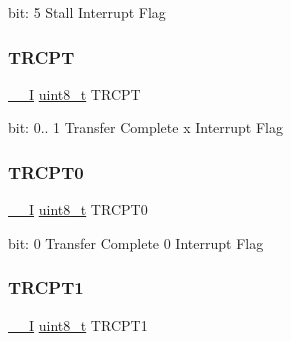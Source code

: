 bit\+: 5 Stall Interrupt Flag \mbox{\label{union_u_s_b___h_o_s_t___p_i_n_t_f_l_a_g___type_aa0eaaaed088030494d4abca08d5faf2e}} 
\subsubsection{\texorpdfstring{TRCPT}{TRCPT}}
{\footnotesize\ttfamily \mbox{\hyperlink{core__cm0plus_8h_af63697ed9952cc71e1225efe205f6cd3}{\+\_\+\+\_\+I}} \mbox{\hyperlink{union_u_s_b___h_o_s_t___p_i_n_t_f_l_a_g___type_a5b4208c6f4c4a4290c4f2804d1eb1d5b}{uint8\+\_\+t}} T\+R\+C\+PT}

bit\+: 0.. 1 Transfer Complete x Interrupt Flag \mbox{\label{union_u_s_b___h_o_s_t___p_i_n_t_f_l_a_g___type_a35abeb4415a3f78c80da9ad7b820fdc0}} 
\subsubsection{\texorpdfstring{TRCPT0}{TRCPT0}}
{\footnotesize\ttfamily \mbox{\hyperlink{core__cm0plus_8h_af63697ed9952cc71e1225efe205f6cd3}{\+\_\+\+\_\+I}} \mbox{\hyperlink{union_u_s_b___h_o_s_t___p_i_n_t_f_l_a_g___type_a5b4208c6f4c4a4290c4f2804d1eb1d5b}{uint8\+\_\+t}} T\+R\+C\+P\+T0}

bit\+: 0 Transfer Complete 0 Interrupt Flag \mbox{\label{union_u_s_b___h_o_s_t___p_i_n_t_f_l_a_g___type_a96d54fd41ad99b8c9b4d7af4e1acf14d}} 
\subsubsection{\texorpdfstring{TRCPT1}{TRCPT1}}
{\footnotesize\ttfamily \mbox{\hyperlink{core__cm0plus_8h_af63697ed9952cc71e1225efe205f6cd3}{\+\_\+\+\_\+I}} \mbox{\hyperlink{union_u_s_b___h_o_s_t___p_i_n_t_f_l_a_g___type_a5b4208c6f4c4a4290c4f2804d1eb1d5b}{uint8\+\_\+t}} T\+R\+C\+P\+T1}

